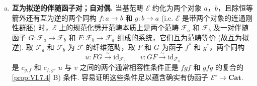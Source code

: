 \begin{enumerate}[a)]
\item \textbf{互为拟逆的伴随函子对；自对偶.} 当基范畴 $\mathcal{E}$ 约化为两个对象 $a$，$b$，且除恒等箭外还有互为逆的两个同构 $f \colon a \to b$ 和 $g \colon b \to a$ (i.e. $\mathcal{E}$ 是带两个对象的连通刚性群胚) 时，$\mathcal{E}$ 上的规范化劈开范畴本质上是两个范畴 $\mathcal{F}_a$ 和 $\mathcal{F}_b$ 及一对伴随函子 $G \colon \mathcal{F}_a \to \mathcal{F}_b$ 和 $F \colon \mathcal{F}_b \to \mathcal{F}_a$ 组成的系统，它们互为范畴等价 (故互为拟逆). 取 $\mathcal{F}_a$ 和 $\mathcal{F}_b$ 为 $\mathcal{F}$ 的纤维范畴，取 $F$ 和 $G$ 为函子 $f^{*}$ 和 $g^{*}$，两个同构
\[
u \colon FG \stackrel{\sim}{\longrightarrow} \mathrm{id}_{\mathcal{F}_a} \qquad v \colon GF \stackrel{\sim}{\longrightarrow} \mathrm{id}_{\mathcal{F}_b}
\]
是 $c_{g,f}$ 和 $c_{f,g}$. $u$ 与 $v$ 之间的两个通常相容性条件正是 $fgf$ 和 $gfg$ 的复合的 \ref{prop:VI.7.4} B) 条件. 容易证明这些条件足以蕴含确实有伪函子 $\mathcal{E}^{\circ} \to \mathbf{Cat}$.


\end{enumerate}
